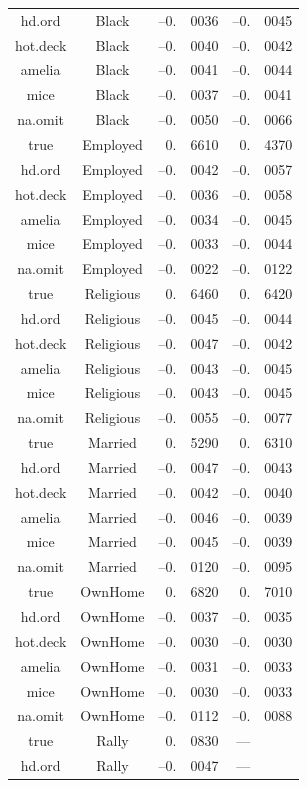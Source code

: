 \documentclass[12pt,econ]{sources/authesis}
\begin{document}
\begin{longtable}{ccr@{}lr@{}l}
 hd.ord & Black & --0.&0036 & --0.&0045 \\
 hot.deck & Black & --0.&0040 & --0.&0042 \\
 amelia & Black & --0.&0041 & --0.&0044 \\ 
 mice & Black & --0.&0037 & --0.&0041 \\ 
 na.omit & Black & --0.&0050 & --0.&0066 \\ 
 true & Employed & 0.&6610 & 0.&4370 \\ 
 hd.ord & Employed & --0.&0042 & --0.&0057 \\ 
 hot.deck & Employed & --0.&0036 & --0.&0058 \\ 
 amelia & Employed & --0.&0034 & --0.&0045 \\ 
 mice & Employed & --0.&0033 & --0.&0044 \\ 
 na.omit & Employed & --0.&0022 & --0.&0122 \\ 
 true & Religious & 0.&6460 & 0.&6420 \\
 hd.ord & Religious & --0.&0045 & --0.&0044 \\
 hot.deck & Religious & --0.&0047 & --0.&0042 \\
 amelia & Religious & --0.&0043 & --0.&0045 \\ 
 mice & Religious & --0.&0043 & --0.&0045 \\ 
 na.omit & Religious & --0.&0055 & --0.&0077 \\ 
 true & Married & 0.&5290 & 0.&6310 \\ 
 hd.ord & Married & --0.&0047 & --0.&0043 \\ 
 hot.deck & Married & --0.&0042 & --0.&0040 \\
 amelia & Married & --0.&0046 & --0.&0039 \\ 
 mice & Married & --0.&0045 & --0.&0039 \\ 
 na.omit & Married & --0.&0120 & --0.&0095 \\
 true & OwnHome & 0.&6820 & 0.&7010 \\
 hd.ord & OwnHome & --0.&0037 & --0.&0035 \\ 
 hot.deck & OwnHome & --0.&0030 & --0.&0030 \\
 amelia & OwnHome & --0.&0031 & --0.&0033 \\
 mice & OwnHome & --0.&0030 & --0.&0033 \\ 
 na.omit & OwnHome & --0.&0112 & --0.&0088 \\ 
 true & Rally & 0.&0830 & --- \\ 
 hd.ord & Rally & --0.&0047 & --- \\ 

\end{longtable}
\end{document}
